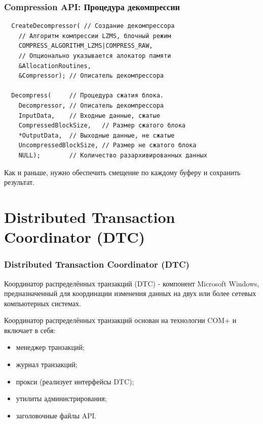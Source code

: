 \documentclass{beamer}
\begin{document}
\begin{frame}[fragile]
\frametitle{Compression API: Процедура декомпрессии}

\begin{verbatim}
  CreateDecompressor( // Создание декомпрессора
    // Алгоритм компрессии LZMS, блочный режим
    COMPRESS_ALGORITHM_LZMS|COMPRESS_RAW,
    // Опционально указывается алокатор памяти
    &AllocationRoutines,                    
    &Compressor); // Описатель декомпрессора
   
  Decompress(     // Процедура сжатия блока.
    Decompressor, // Описатель декомпрессора
    InputData,    // Входные данные, сжатые
    CompressedBlockSize,   // Размер сжатого блока
    *OutputData,  // Выходные данные, не сжатые
    UncompressedBlockSize, // Размер не сжатого блока
    NULL);        // Количество разархивированных данных
\end{verbatim}

Как и раньше, нужно обеспечить смещение по каждому буферу и сохранить результат.

\end{frame}

\section{Distributed Transaction Coordinator (DTC)}

\begin{frame}
\frametitle{Distributed Transaction Coordinator (DTC)}

Координатор распределённых транзакций (DTC) - компонент Microsoft Windows, предназначенный для координации изменения данных на двух или более сетевых компьютерных системах.
\medskip

Координатор распределённых транзакций основан на технологии COM+ и включает в себя:
\begin{itemize}
\item менеджер транзакций;
\item журнал транзакций;
\item прокси (реализует интерфейсы DTC);
\item утилиты администрирования;
\item заголовочные файлы API.
\end{itemize}

\end{frame}

\end{document}
